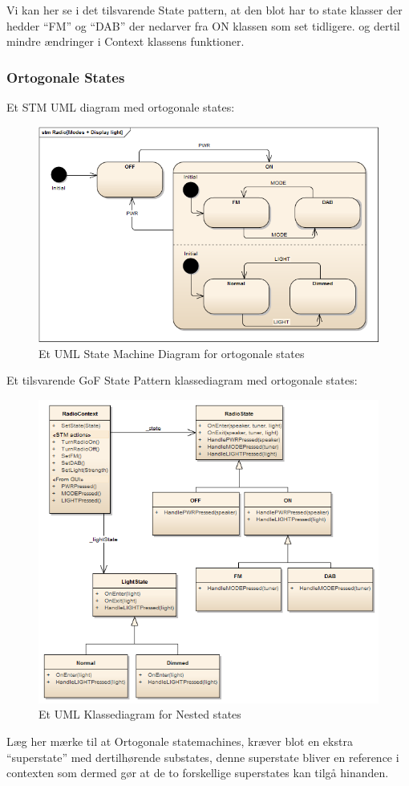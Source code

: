 Vi kan her se i det tilsvarende State pattern, at den blot har to state klasser der hedder “FM” og “DAB” der nedarver fra ON klassen som set tidligere. og dertil mindre ændringer i Context klassens funktioner. 

\subsubsection{Ortogonale States}

Et STM UML diagram med ortogonale states:

\begin{figure}[H]
	\centering
	\includegraphics[width=0.7\linewidth]{figs/state/RadioModesDisplayLight}
	\caption{Et UML State Machine Diagram for ortogonale states}
	\label{fig:umlOrtogonalState}
\end{figure}

Et tilsvarende GoF State Pattern klassediagram med ortogonale states:

\begin{figure}[H]
	\centering
	\includegraphics[width=0.7\linewidth]{figs/state/RadioOrthogonal_SP}
	\caption{Et UML Klassediagram for Nested states}
	\label{fig:UMLClassOrtogonalState}
\end{figure}

Læg her mærke til at Ortogonale statemachines, kræver blot en ekstra “superstate” med dertilhørende substates, denne superstate bliver en reference i contexten som dermed gør at de to forskellige superstates kan tilgå hinanden.

